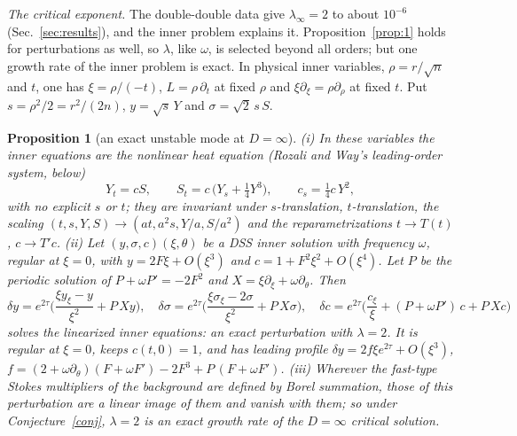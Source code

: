 \documentclass[aps,prd,onecolumn,superscriptaddress,nofootinbib,10pt]{revtex4-2}
\newtheorem{proposition}{Proposition}
\begin{document}
\emph{The critical exponent.} The double-double data give $\lambda_\infty = 2$ to about $10^{-6}$ (Sec.~\ref{sec:results}),
and the inner problem explains it. Proposition~\ref{prop:1} holds for perturbations as well, so $\lambda$, like $\omega$, is
selected beyond all orders; but one growth rate of the inner problem is exact. In physical inner variables, $\rho = r/\sqrt n$
and $t$, one has $\xi = \rho/(-t)$, $L = \rho\,\partial_t$ at fixed $\rho$ and $\xi\partial_\xi = \rho\partial_\rho$ at fixed $t$. Put
$s = \rho^2/2 = r^2/(2n)$, $y = \sqrt s\,Y$ and $\sigma = \sqrt2\,s\,S$.

\begin{proposition}[an exact unstable mode at $D = \infty$]\label{prop:5}
(i) In these variables the inner equations are the nonlinear heat equation (Rozali and Way's leading-order system,
below)
\begin{equation}
Y_t = cS,\qquad S_t = c\,\big(Y_s + \tfrac14 Y^3\big),\qquad c_s = \tfrac14 c\,Y^2 ,
\end{equation}
with no explicit $s$ or $t$; they are invariant under $s$-translation, $t$-translation, the scaling
$(t, s, Y, S) \to (at, a^2s, Y/a, S/a^2)$ and the reparametrizations $t \to T(t)$, $c \to T'c$.
(ii) Let $(y, \sigma, c)(\xi, \theta)$ be a DSS inner solution with frequency $\omega$, regular at $\xi = 0$, with $y = 2F\xi + O(\xi^3)$
and $c = 1 + F^2\xi^2 + O(\xi^4)$. Let $P$ be the periodic solution of $P + \omega P' = -2F^2$ and $X = \xi\partial_\xi + \omega\partial_\theta$. Then
\begin{equation}
\delta y = e^{2\tau}\Big(\frac{\xi y_\xi - y}{\xi^2} + P\,Xy\Big),\quad
\delta\sigma = e^{2\tau}\Big(\frac{\xi\sigma_\xi - 2\sigma}{\xi^2} + P\,X\sigma\Big),\quad
\delta c = e^{2\tau}\Big(\frac{c_\xi}{\xi} + (P + \omega P')\,c + P\,Xc\Big)
\end{equation}
solves the linearized inner equations: an exact perturbation with $\lambda = 2$. It is regular at $\xi = 0$, keeps $c(t, 0) = 1$,
and has leading profile $\delta y = 2f\xi e^{2\tau} + O(\xi^3)$, $f = (2 + \omega\partial_\theta)(F + \omega F') - 2F^3 + P\,(F + \omega F')$.
(iii) Wherever the fast-type Stokes multipliers of the background are defined by Borel summation, those of this
perturbation are a linear image of them and vanish with them; so under Conjecture~\ref{conj}, $\lambda = 2$ is an exact growth
rate of the $D = \infty$ critical solution.
\end{proposition}
\end{document}
